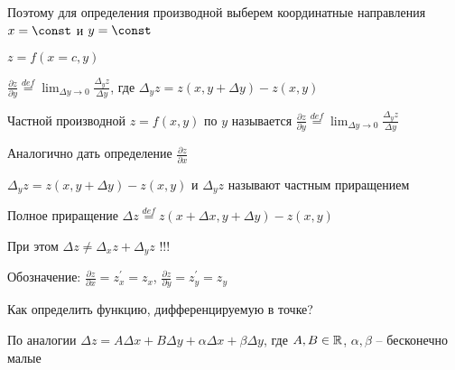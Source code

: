 \documentclass[12pt]{article}
\begin{document}
    Поэтому для определения производной выберем координатные направления $x = \const$ и $y = \const$

    $z = f(x = c, y)$

    \hypertarget{partialderivativeoffunctionoftwovariables}{}

    $\displaystyle \frac{\partial z}{\partial y} \stackrel{def}{=} \lim_{\Delta y \to 0} \frac{\Delta_y z}{\Delta y}$,
    где $\Delta_y z = z(x, y + \Delta y) - z(x, y)$

    \Def Частной производной $z = f(x, y)$ по $y$ называется $\displaystyle \frac{\partial z}{\partial y} \stackrel{def}{=} \lim_{\Delta y \to 0} \frac{\Delta_y z}{\Delta y}$

    \Lab Аналогично дать определение $\displaystyle \frac{\partial z}{\partial x}$

    \Notas $\Delta_y z = z(x, y + \Delta y) - z(x, y)$ и  $\Delta_y z$ называют частным приращением

    \Def Полное приращение $\Delta z \stackrel{def}{=} z(x + \Delta x, y + \Delta y) - z(x, y)$

    \Notas При этом $\Delta z \neq \Delta_x z + \Delta_y z$ !!!

    Обозначение: $\displaystyle \frac{\partial z}{\partial x} = z^\prime_x = z_x$, $\displaystyle \frac{\partial z}{\partial y} = z^\prime_y = z_y$

    Как определить функцию, дифференцируемую в точке?

    По аналогии $\Delta z = A \Delta x + B \Delta y + \alpha \Delta x + \beta \Delta y$, где $A, B \in \mathbb{R}$, $\alpha, \beta$ -- бесконечно малые
\end{document}
